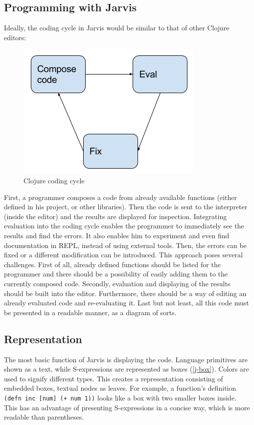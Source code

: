 \documentclass[11pt]{scrartcl}
\begin{document}
\subsection{Programming with Jarvis}
Ideally, the coding cycle in Jarvis would be similar to that of other Clojure
editors:

\begin{figure}[hbt]
  \includegraphics[scale=0.5]{img/Programming.png}
  \caption{Clojure coding cycle}
\end{figure}

First, a programmer composes a code from already available functions (either
defined in his project, or other libraries).
Then the code is sent to the interpreter (inside the editor) and the results are
displayed for inspection.
Integrating evaluation into the coding cycle enables the programmer to
immediately see the results and find the errors.
It also enables him to experiment and even find documentation in REPL, instead
of using external tools.
Then, the errors can be fixed or a different modification can be introduced.
This approach poses several challenges.
First of all, already defined functions should be listed for the programmer and
there should be a possibility of easily adding them to the currently composed
code.
Secondly, evaluation and displaying of the results should be built into the
editor.
Furthermore, there should be a way of editing an already evaluated code and
re-evaluating it.
Last but not least, all this code must be presented in a readable manner, as a
diagram of sorts.

\subsection{Representation}
The most basic function of Jarvis is displaying the code.
Language primitives are shown as a text, while S-expressions are
represented as boxes (\ref{j-box}).
Colors are used to signify different types.
This creates a representation consisting of embedded boxes, textual nodes as
leaves.
For example, a function’s definition \lstinline|(defn inc [num] (+ num 1))| looks like a box
with two smaller boxes inside.
This has an advantage of presenting S-expressions in a concise way, which is
more readable than parentheses.
\end{document}
